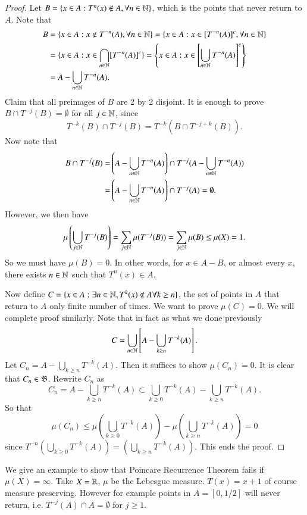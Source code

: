 \documentclass[12pt,a4paper]{article}
\begin{document}
	\begin{proof}
		Let $B=\{x\in A: T^n(x)\notin A,\forall n\in\mathbb{N}\}$, which is the points that never return to $A$. Note that
		\begin{align*}
			B&=\{x\in A: x\notin T^{-n}(A),\forall n\in\mathbb{N}\}=\{x\in A: x\in [T^{-n}(A)]^c,\forall n\in\mathbb{N}\}\\
			&=\{x\in A: x\in \bigcap_{n\in \mathbb{N}}[T^{-n}(A)]^c \}=\left\{x\in A: x\in\left[\bigcup_{n\in \mathbb{N}}T^{-n}(A)\right]^c\right\}\\
			&=A-\bigcup_{n\in \mathbb{N}}T^{-n}(A).
		\end{align*}
	Claim that all preimages of $B$ are 2 by 2 disjoint. It is enough to prove $B\cap T^{-j}(B)=\emptyset$ for all $j\in\mathbb{N}$, since
	$$
	T^{-k}(B)\cap T^{-j}(B)=T^{-k}(B\cap T^{-j+k}(B)).
	$$
	Now note that
	\begin{align*}
		B\cap T^{-j}(B)=&\left(A-\bigcup_{n\in \mathbb{N}} T^{-n}(A)\right)\cap T^{-j}(A-\bigcup_{n\in \mathbb{N}}T^{-n}(A))\\
		=& \left(A-\bigcup_{n\in \mathbb{N}} T^{-n}(A)\right)\cap T^{-j}(A)=\emptyset.
	\end{align*}
	However, we then have
	$$
	\mu\left(\bigcup_{j\in \mathbb{N}}T^{-j}(B)\right)=\sum_{j\in\mathbb{N}} \mu(T^{-j}(B))=\sum_{j\in\mathbb{N}}\mu(B)\leq \mu(X)=1.
	$$
	So we must have $\mu(B)=0$. In other words, for $x\in A-B$, or almost every $x$, there exists $n\in\mathbb{N}$ such that $T^n(x)\in A$.
	
	Now define $C=\{x\in A:\exists n\in\mathbb{N}, T^k(x)\notin A \forall k\geq n\}$, the set of points in $A$ that return to $A$ only finite number of times. We want to prove $\mu(C)=0$. We will complete proof similarly. Note that in fact as what we done previously
	$$
	C=\bigcup_{n\in \mathbb{N}}\left[A-\bigcup_{k\geq n}T^{-k}(A)\right].
	$$
	Let $C_n = A-\bigcup_{k\geq n}T^{-k}(A)$. Then it suffices to show $\mu(C_n)=0$. It is clear that $C_n\in \mathfrak{B}$. Rewrite $C_n$ as
	$$
	C_n = A-\bigcup_{k\geq n}T^{-k}(A)\subset \bigcup_{k\geq 0}T^{-k}(A)-\bigcup_{k\geq n}T^{-k}(A).
	$$
	So that
	$$
	\mu(C_n)\leq \mu\left(\bigcup_{k\geq 0}T^{-k}(A)\right)-\mu\left(\bigcup_{k\geq n}T^{-k}(A)\right)=0
	$$
	since $T^{-n}\left(\bigcup_{k\geq 0}T^{-k}(A)\right)=\left(\bigcup_{k\geq n}T^{-k}(A)\right)$. This ends the proof.
	\end{proof}
	We give an example to show that Poincare Recurrence Theorem fails if $\mu(X)=\infty$. Take $X=\mathbb{R}$, $\mu$ be the Lebesgue measure. $T(x)=x+1$ of course measure preserving. However for example points in $A=[0,1/2]$ will never return, i.e. $T^{-j}(A)\cap A=\emptyset$ for $j\geq 1$.
\end{document}

